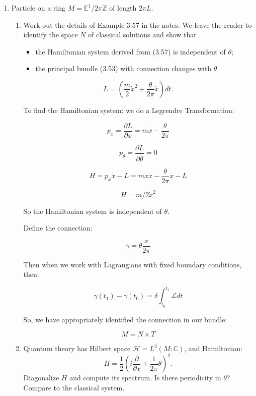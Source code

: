 \begin{enumerate}
    \item[(3)] Particle on a ring $M = \mathbb{E}^1 / 2\pi \mathbb{Z}$ of length $2\pi L$.
    \begin{enumerate}
        \item[(a)] Work out the details of Example 3.57 in the notes. We leave the reader to identify the space $N$ of classical solutions and show that
        \begin{itemize}
         \item the Hamiltonian system derived from (3.57) is independent of $\theta$;
        \item the principal bundle (3.53) with connection changes with $\theta$.
        \end{itemize}

        \begin{equation}
        L = \left( \frac{m}{2} \dot{x}^2 + \frac{\theta}{2\pi} \dot{x} \right) dt.
        \end{equation}

        To find the Hamiltonian system: we do a Legrendre Transformation:

        $$p_{x} = \frac{\partial L}{\partial \dot{x}} = m \dot{x} - \frac{\theta}{2 \pi}$$

        $$p_{\theta} = \frac{\partial L}{\partial \dot{\theta}} = 0$$

        $$H = p_{x} \dot{x} - L = m \dot{x} \dot{x} -  \frac{\theta}{2 \pi} \dot{x} - L$$

        $$H = m/2 \dot{x}^2$$

        So the Hamiltonian system is independent of $\theta$. 

        Define the connection:

        $$\gamma = \theta \frac{x}{2 \pi}$$

        Then when we work with Lagrangians with fixed boundary conditions, then:

        $$\gamma(t_{1}) - \gamma(t_{0}) = \delta \int_{t_{0}}^{t_{1}} \mathcal{L} dt$$

        So, we have appropriately identified the connection in our bundle:

        $$M = N \times T$$


        \item[(b)] Quantum theory has Hilbert space $\mathcal{H} = L^2(M; \mathbb{C})$, and Hamiltonian:
        \[
        H = \frac{1}{2} \left( i \frac{\partial}{\partial x} + \frac{1}{2\pi} \theta \right)^2.
        \]
        Diagonalize $H$ and compute its spectrum. Is there periodicity in $\theta$? Compare to the classical system.



\end{enumerate}
\end{enumerate}
